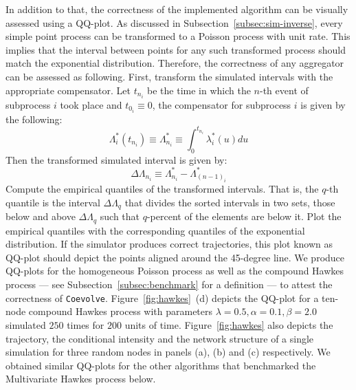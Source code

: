 \documentclass{juliacon}
\numberwithin{equation}{section}
\begin{document}
In addition to that, the correctness of the implemented algorithm can be visually assessed using a QQ-plot. As discussed in Subsection~\ref{subsec:sim-inverse}, every simple point process can be transformed to a Poisson process with unit rate. This implies that the interval between points for any such transformed process should match the exponential distribution. Therefore, the correctness of any aggregator can be assessed as following. First, transform the simulated intervals with the appropriate compensator. Let \( t_{n_i} \) be the time in which the \( n \)-th event of subprocess \( i \) took place and \( t_{0_i} \equiv 0 \), the compensator for subprocess \( i \) is given by the following:
\begin{equation}
  \Lambda_i^\ast(t_{n_i}) \equiv \Lambda_{n_i}^\ast \equiv \int_0^{t_{n_i}} \lambda_i^\ast(u) du 
\end{equation}
Then the transformed simulated interval is given by:
\begin{equation}
  \Delta \Lambda_{n_i} \equiv \Lambda_{n_i}^\ast - \Lambda_{(n-1)_i}^\ast
\end{equation}
Compute the empirical quantiles of the transformed intervals. That is, the \( q \)-th quantile is the interval \( \Delta \Lambda_q \) that divides the sorted intervals in two sets, those below and above \( \Delta \Lambda_q \) such that \( q \)-percent of the elements are below it. Plot the empirical quantiles with the corresponding quantiles of the exponential distribution. If the simulator produces correct trajectories, this plot known as QQ-plot should depict the points aligned around the 45-degree line. We produce QQ-plots for the homogeneous Poisson process as well as the compound Hawkes process --- see Subsection~\ref{subsec:benchmark} for a definition --- to attest the correctness of \texttt{Coevolve}. Figure~\ref{fig:hawkes}~(d) depicts the QQ-plot for a ten-node compound Hawkes process with parameters \( \lambda = 0.5 , \alpha = 0.1 , \beta = 2.0 \) simulated \( 250 \) times for \( 200 \) units of time. Figure~\ref{fig:hawkes} also depicts the trajectory, the conditional intensity and the network structure of a single simulation for three random nodes in panels (a), (b) and (c) respectively. We obtained similar QQ-plots for the other algorithms that benchmarked the Multivariate Hawkes process below.
\end{document}
